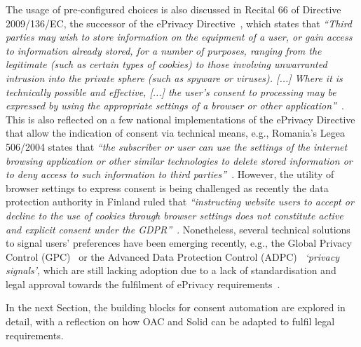 The usage of pre-configured choices is also discussed in Recital 66 of Directive 2009/136/EC, the successor of the ePrivacy Directive~\citeyearpar{noauthor_directive_2002}, which states that \textit{``Third parties may wish to store information on the equipment of a user, or gain access to information already stored, for a number of purposes, ranging from the legitimate (such as certain types of cookies) to those involving unwarranted intrusion into the private sphere (such as spyware or viruses). [...] Where it is technically possible and effective, [...] the user's consent to processing may be expressed by using the appropriate settings of a browser or other application''}~\citeyearpar{noauthor_directive_2009}.
This is also reflected on a few national implementations of the ePrivacy Directive that allow the indication of consent via technical means, e.g., Romania's Legea 506/2004 states that \textit{``the subscriber or user can use the settings of the internet browsing application or other similar technologies to delete stored information or to deny access to such information to third parties''}~\citeyearpar{noauthor_legea_2004}.
However, the utility of browser settings to express consent is being challenged as recently the data protection authority in Finland ruled that \textit{``instructing website users to accept or decline to the use of cookies through browser settings does not constitute active and explicit consent under the GDPR''}~\citep{fich_finland_2021}.
Nonetheless, several technical solutions to signal users' preferences have been emerging recently, e.g., the Global Privacy Control (GPC)~\citep{global_privacy_control_gpc_2021} or the Advanced Data Protection Control (ADPC)~\citep{human_advanced_2021} \textit{`privacy signals'}, which are still lacking adoption due to a lack of standardisation and legal approval towards the fulfilment of ePrivacy requirements~\citep{santos_how_2023}.

In the next Section, the building blocks for consent automation are explored in detail, with a reflection on how OAC and Solid can be adapted to fulfil legal requirements. 